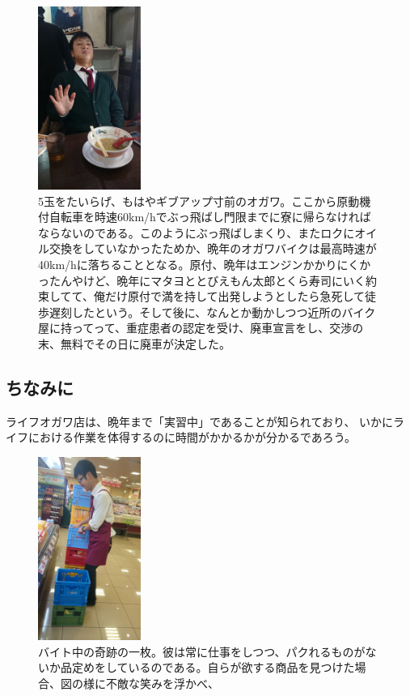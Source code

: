 \begin{figure}[h]
\centering
\includegraphics[width=0.3\textwidth]{./section/Shokuji/figures/Toraryuu_1.jpg}
  \caption{5玉をたいらげ、もはやギブアップ寸前のオガワ。ここから原動機付自転車を時速60km/hでぶっ飛ばし門限までに寮に帰らなければならないのである。このようにぶっ飛ばしまくり、またロクにオイル交換をしていなかったためか、晩年のオガワバイクは最高時速が40km/hに落ちることとなる。原付、晩年はエンジンかかりにくかったんやけど、晩年にマタヨととびえもん太郎とくら寿司にいく約束してて、俺だけ原付で満を持して出発しようとしたら急死して徒歩遅刻したという。そして後に、なんとか動かしつつ近所のバイク屋に持ってって、重症患者の認定を受け、廃車宣言をし、交渉の末、無料でその日に廃車が決定した。}
\label{Fig:Seiza}
\end{figure}

\subsection{ちなみに}
ライフオガワ店は、晩年まで「実習中」であることが知られており、
いかにライフにおける作業を体得するのに時間がかかるかが分かるであろう。

\begin{figure}[h]
\centering
\includegraphics[width=0.3\textwidth]{./section/Shokuji/figures/Life_byte.jpg}
  \caption{バイト中の奇跡の一枚。彼は常に仕事をしつつ、パクれるものがないか品定めをしているのである。自らが欲する商品を見つけた場合、図の様に不敵な笑みを浮かべ、}
\label{Fig:Seiza}
\end{figure}

